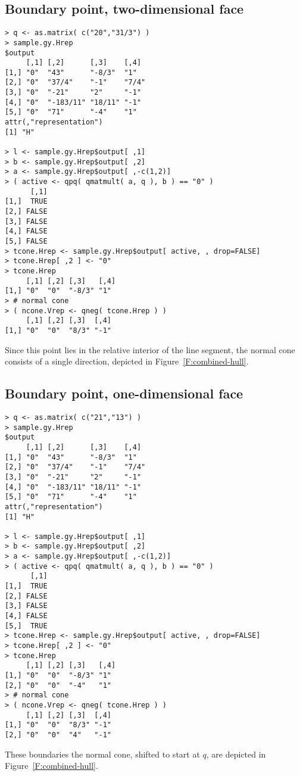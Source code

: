 \subsection{Boundary point, two-dimensional face}
\begin{verbatim}
> q <- as.matrix( c("20","31/3") )
> sample.gy.Hrep
$output
     [,1] [,2]      [,3]    [,4] 
[1,] "0"  "43"      "-8/3"  "1"  
[2,] "0"  "37/4"    "-1"    "7/4"
[3,] "0"  "-21"     "2"     "-1" 
[4,] "0"  "-183/11" "18/11" "-1" 
[5,] "0"  "71"      "-4"    "1"  
attr(,"representation")
[1] "H"

> l <- sample.gy.Hrep$output[ ,1]
> b <- sample.gy.Hrep$output[ ,2]
> a <- sample.gy.Hrep$output[ ,-c(1,2)]
> ( active <- qpq( qmatmult( a, q ), b ) == "0" )
      [,1]
[1,]  TRUE
[2,] FALSE
[3,] FALSE
[4,] FALSE
[5,] FALSE
> tcone.Hrep <- sample.gy.Hrep$output[ active, , drop=FALSE]
> tcone.Hrep[ ,2 ] <- "0"
> tcone.Hrep
     [,1] [,2] [,3]   [,4]
[1,] "0"  "0"  "-8/3" "1" 
> # normal cone
> ( ncone.Vrep <- qneg( tcone.Hrep ) )
     [,1] [,2] [,3]  [,4]
[1,] "0"  "0"  "8/3" "-1"
\end{verbatim}
Since this point lies in the relative interior of the line segment,
the normal cone consists of a single direction, depicted in Figure~\ref{F:combined-hull}.

\subsection{Boundary point, one-dimensional face}
\begin{verbatim}
> q <- as.matrix( c("21","13") )
> sample.gy.Hrep
$output
     [,1] [,2]      [,3]    [,4] 
[1,] "0"  "43"      "-8/3"  "1"  
[2,] "0"  "37/4"    "-1"    "7/4"
[3,] "0"  "-21"     "2"     "-1" 
[4,] "0"  "-183/11" "18/11" "-1" 
[5,] "0"  "71"      "-4"    "1"  
attr(,"representation")
[1] "H"

> l <- sample.gy.Hrep$output[ ,1]
> b <- sample.gy.Hrep$output[ ,2]
> a <- sample.gy.Hrep$output[ ,-c(1,2)]
> ( active <- qpq( qmatmult( a, q ), b ) == "0" )
      [,1]
[1,]  TRUE
[2,] FALSE
[3,] FALSE
[4,] FALSE
[5,]  TRUE
> tcone.Hrep <- sample.gy.Hrep$output[ active, , drop=FALSE]
> tcone.Hrep[ ,2 ] <- "0"
> tcone.Hrep
     [,1] [,2] [,3]   [,4]
[1,] "0"  "0"  "-8/3" "1" 
[2,] "0"  "0"  "-4"   "1" 
> # normal cone
> ( ncone.Vrep <- qneg( tcone.Hrep ) )
     [,1] [,2] [,3]  [,4]
[1,] "0"  "0"  "8/3" "-1"
[2,] "0"  "0"  "4"   "-1"
\end{verbatim}
These boundaries the normal cone, shifted to start at $q$, are 
depicted in Figure~\ref{F:combined-hull}.

